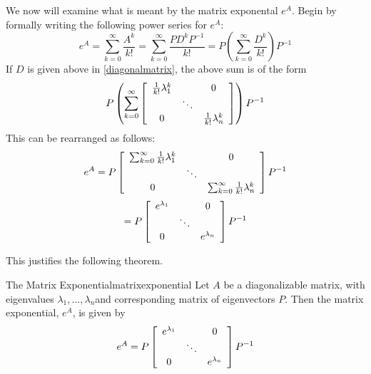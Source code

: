 We now will examine what is meant by the matrix exponental $e^{A}$. Begin by formally writing the following power series for $e^{A}$:
\begin{equation*}
e^{A} =  \sum_{k=0}^{\infty }\frac{A^{k}}{k!}=\sum_{k=0}^{\infty }\frac{PD^{k}P^{-1}}{k!}=P \left( \sum_{k=0}^{\infty }\frac{D^{k}}{k!} \right)P^{-1}
\end{equation*}
If $D$ is given above in \ref{diagonalmatrix}, the above sum is of the form 
\begin{equation*}
P \left( \sum_{k=0}^{\infty }\left[ 
\begin{array}{ccc}
\frac{1}{k!}\lambda _{1}^{k} &  & 0 \\ 
& \ddots &  \\ 
0 &  & \frac{1}{k!}\lambda _{n}^{k}
\end{array}
\right] \right) P^{-1}
\end{equation*}
This can be rearranged as follows:
\begin{equation*}
e^{A}=P\left[ 
\begin{array}{ccc}
\sum_{k=0}^{\infty }\frac{1}{k!}\lambda _{1}^{k} &  & 0 \\ 
& \ddots &  \\ 
0 &  & \sum_{k=0}^{\infty }\frac{1}{k!}\lambda _{n}^{k}
\end{array}
\right] P^{-1}
\end{equation*}
\begin{equation*}
=P\left[ 
\begin{array}{ccc}
e^{\lambda _{1}} &  & 0 \\ 
& \ddots &  \\ 
0 &  & e^{\lambda _{n}}
\end{array}
\right] P^{-1}
\end{equation*}

This justifies the following theorem. 

\begin{theorem}{The Matrix Exponential}{matrixexponential}
Let $A$ be a diagonalizable matrix, with eigenvalues $\lambda_1, ..., \lambda_n$and corresponding matrix of eigenvectors $P$. Then the matrix exponential, $e^{A}$, is given by
\begin{equation*}
e^{A} = 
P\left[ 
\begin{array}{ccc}
e^{\lambda _{1}} &  & 0 \\ 
& \ddots &  \\ 
0 &  & e^{\lambda _{n}}
\end{array}
\right] P^{-1}
\end{equation*}
\end{theorem}


